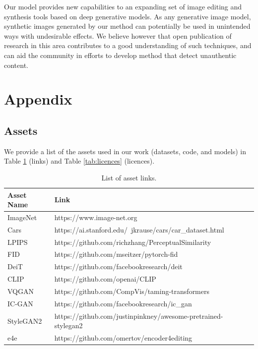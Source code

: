 Our model provides new capabilities to an expanding set of image editing and synthesis 
tools based on deep generative models. As any generative image model, synthetic images 
generated by our method can potentially be used in unintended ways with undesirable 
effects. We believe however that open publication of research in this area contributes 
to a good understanding of such techniques, and can aid the community in efforts to 
develop method that detect unauthentic content. 





\appendix

\section{Appendix}

\subsection{Assets}
We provide a list of the assets used in our work (datasets, code, and models) in
 Table \ref{tab:links} (links) and Table \ref{tab:licences} (licences).


\begin{table}
\center
\begin{tabular}{lll}
\toprule
\textbf{Asset Name} & \textbf{Link} \\
\midrule
ImageNet & https://www.image-net.org \\
Cars & https://ai.stanford.edu/~jkrause/cars/car\_dataset.html \\
LPIPS & https://github.com/richzhang/PerceptualSimilarity \\
FID & https://github.com/mseitzer/pytorch-fid \\
DeiT & https://github.com/facebookresearch/deit \\
CLIP & https://github.com/openai/CLIP \\
VQGAN & https://github.com/CompVis/taming-transformers \\
IC-GAN & https://github.com/facebookresearch/ic\_gan \\
StyleGAN2 & https://github.com/justinpinkney/awesome-pretrained-stylegan2 \\
e4e & https://github.com/omertov/encoder4editing \\
\bottomrule
\end{tabular}
\caption{List of asset links.}
\label{tab:links}
\end{table}

